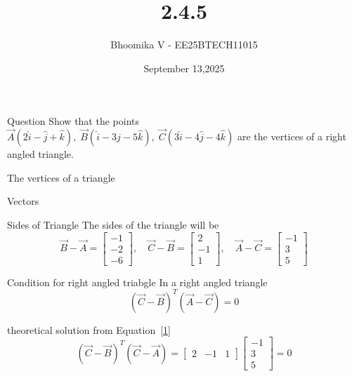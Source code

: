 \documentclass{beamer}
\begin{document}
\title 
{2.4.5}
\date{September 13,2025}


\author 
{Bhoomika V - EE25BTECH11015}




\frame{\titlepage}
\begin{frame}{Question}
Show that the points 
$\vec{A}(2\hat{i} - \hat{j} + \hat{k}),\;
\vec{B}(\hat{i} - 3\hat{j} - 5\hat{k}),\;
\vec{C}(3\hat{i} - 4\hat{j} - 4\hat{k})$
are the vertices of a right angled triangle.
\end{frame}

\begin{frame}{The vertices of a triangle}
\begin{table}[H]    
  \centering
  
  \caption{Vectors}
  \label{Answers}
\end{table}
\end{frame}

\begin{frame}{Sides of Triangle}
The sides of the triangle will be 
\begin{equation}
\vec{B}-\vec{A} = 
\begin{bmatrix}
-1 \\ 
-2 \\ 
-6
\end{bmatrix}, \quad
\vec{C}-\vec{B} = 
\begin{bmatrix}
2 \\ 
-1 \\ 
1
\end{bmatrix}, \quad
\vec{A}-\vec{C} = 
\begin{bmatrix}
-1 \\ 
3 \\ 
5
\end{bmatrix}
\label{1}
\end{equation}
\end{frame}

\begin{frame}{Condition for right angled triabgle}
In a right angled triangle 
\begin{equation}
(\vec{C}-\vec{B})^{T} (\vec{A}-\vec{C}) = 0
\label{2}
\end{equation}
\end{frame}

\begin{frame}{theoretical solution }
from Equation~\eqref{1}
\begin{equation}
(\vec{C}-\vec{B})^{T} (\vec{C}-\vec{A}) = \begin{bmatrix}
2 &-1  & 1
\end{bmatrix}\begin{bmatrix}
-1 \\ 
3 \\ 
5
\end{bmatrix}=0
\end{equation}
\end{frame}
\end{document}
